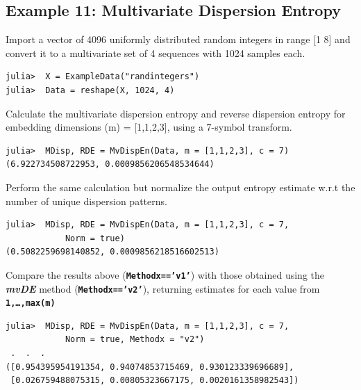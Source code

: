\documentclass[12pt, a4paper, titlepage, openany]{book}
\begin{document}
\subsection{\normalsize Example 11: \hspace{15mm} Multivariate Dispersion Entropy}
\noindent Import a vector of 4096 uniformly distributed random integers in range [1 8] and convert it to a multivariate set of 4 sequences with 1024 samples each.
\begin{verbatim}
julia>  X = ExampleData("randintegers")
julia>  Data = reshape(X, 1024, 4)
\end{verbatim}
Calculate the multivariate dispersion entropy and reverse dispersion entropy for embedding dimensions (m) = [1,1,2,3], using a 7-symbol transform.
\begin{verbatim}
julia>  MDisp, RDE = MvDispEn(Data, m = [1,1,2,3], c = 7)
(6.922734508722953, 0.0009856206548534644)
\end{verbatim}
Perform the same calculation but normalize the output entropy estimate w.r.t the number of unique dispersion patterns.
\begin{verbatim}
julia>  MDisp, RDE = MvDispEn(Data, m = [1,1,2,3], c = 7, 
			Norm = true)
(0.5082259698140852, 0.0009856218516602513)
\end{verbatim}    
Compare the results above (\texttt{\textbf{Methodx=='v1'}}) with those obtained using the \emph{\textbf{mvDE}} method (\texttt{\textbf{Methodx=='v2'}}), returning estimates for each value from \texttt{\textbf{1,…,max(m)}}
\begin{verbatim}
julia>  MDisp, RDE = MvDispEn(Data, m = [1,1,2,3], c = 7, 
			Norm = true, Methodx = "v2")
 .  .  . 
([0.954395954191354, 0.94074853715469, 0.930123339696689], 
 [0.026759488075315, 0.00805323667175, 0.0020161358982543])
\end{verbatim}



\newpage
\end{document}
